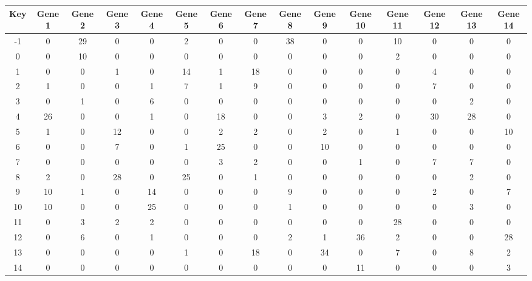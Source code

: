 \begin{tabular}{|c|c|c|c|c|c|c|c|c|c|c|c|c|c|c|}
\hline
Key & Gene 1 & Gene 2 & Gene 3 & Gene 4 & Gene 5 & Gene 6 & Gene 7 & Gene 8 & Gene 9 & Gene 10 & Gene 11 & Gene 12 & Gene 13 & Gene 14 \\
\hline
-1 & 0 & 29 & 0 & 0 & 2 & 0 & 0 & 38 & 0 & 0 & 10 & 0 & 0 & 0 \\
0 & 0 & 10 & 0 & 0 & 0 & 0 & 0 & 0 & 0 & 0 & 2 & 0 & 0 & 0 \\
1 & 0 & 0 & 1 & 0 & 14 & 1 & 18 & 0 & 0 & 0 & 0 & 4 & 0 & 0 \\
2 & 1 & 0 & 0 & 1 & 7 & 1 & 9 & 0 & 0 & 0 & 0 & 7 & 0 & 0 \\
3 & 0 & 1 & 0 & 6 & 0 & 0 & 0 & 0 & 0 & 0 & 0 & 0 & 2 & 0 \\
4 & 26 & 0 & 0 & 1 & 0 & 18 & 0 & 0 & 3 & 2 & 0 & 30 & 28 & 0 \\
5 & 1 & 0 & 12 & 0 & 0 & 2 & 2 & 0 & 2 & 0 & 1 & 0 & 0 & 10 \\
6 & 0 & 0 & 7 & 0 & 1 & 25 & 0 & 0 & 10 & 0 & 0 & 0 & 0 & 0 \\
7 & 0 & 0 & 0 & 0 & 0 & 3 & 2 & 0 & 0 & 1 & 0 & 7 & 7 & 0 \\
8 & 2 & 0 & 28 & 0 & 25 & 0 & 1 & 0 & 0 & 0 & 0 & 0 & 2 & 0 \\
9 & 10 & 1 & 0 & 14 & 0 & 0 & 0 & 9 & 0 & 0 & 0 & 2 & 0 & 7 \\
10 & 10 & 0 & 0 & 25 & 0 & 0 & 0 & 1 & 0 & 0 & 0 & 0 & 3 & 0 \\
11 & 0 & 3 & 2 & 2 & 0 & 0 & 0 & 0 & 0 & 0 & 28 & 0 & 0 & 0 \\
12 & 0 & 6 & 0 & 1 & 0 & 0 & 0 & 2 & 1 & 36 & 2 & 0 & 0 & 28 \\
13 & 0 & 0 & 0 & 0 & 1 & 0 & 18 & 0 & 34 & 0 & 7 & 0 & 8 & 2 \\
14 & 0 & 0 & 0 & 0 & 0 & 0 & 0 & 0 & 0 & 11 & 0 & 0 & 0 & 3 \\
\hline
\end{tabular}